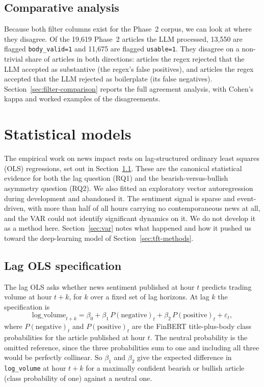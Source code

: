 \subsection{Comparative analysis}\label{sec:filter-comparison-methods}

Because both filter columns exist for the Phase~2 corpus, we can look at where they disagree. Of the 19{,}619 Phase~2 articles the LLM processed, 13{,}550 are flagged \texttt{body\_valid=1} and 11{,}675 are flagged \texttt{usable=1}. They disagree on a non-trivial share of articles in both directions: articles the regex rejected that the LLM accepted as substantive (the regex's false positives), and articles the regex accepted that the LLM rejected as boilerplate (its false negatives). Section~\ref{sec:filter-comparison} reports the full agreement analysis, with Cohen's kappa and worked examples of the disagreements.

\section{Statistical models}\label{sec:statistical-models}

The empirical work on news impact rests on lag-structured ordinary least squares (OLS) regressions, set out in Section~\ref{sec:ols-spec}. These are the canonical statistical evidence for both the lag question (RQ1) and the bearish-versus-bullish asymmetry question (RQ2). We also fitted an exploratory vector autoregression during development and abandoned it. The sentiment signal is sparse and event-driven, with more than half of all hours carrying no contemporaneous news at all, and the VAR could not identify significant dynamics on it. We do not develop it as a method here. Section~\ref{sec:var} notes what happened and how it pushed us toward the deep-learning model of Section~\ref{sec:tft-methods}.

\subsection{Lag OLS specification}\label{sec:ols-spec}

The lag OLS asks whether news sentiment published at hour $t$ predicts trading volume at hour $t + k$, for $k$ over a fixed set of lag horizons. At lag $k$ the specification is
\begin{equation}
  \text{log\_volume}_{t+k} = \beta_0 + \beta_1\, P(\text{negative})_t + \beta_2\, P(\text{positive})_t + \varepsilon_t ,
\end{equation}
where $P(\text{negative})_t$ and $P(\text{positive})_t$ are the FinBERT title-plus-body class probabilities for the article published at hour $t$. The neutral probability is the omitted reference, since the three probabilities sum to one and including all three would be perfectly collinear. So $\beta_1$ and $\beta_2$ give the expected difference in \texttt{log\_volume} at hour $t + k$ for a maximally confident bearish or bullish article (class probability of one) against a neutral one.

